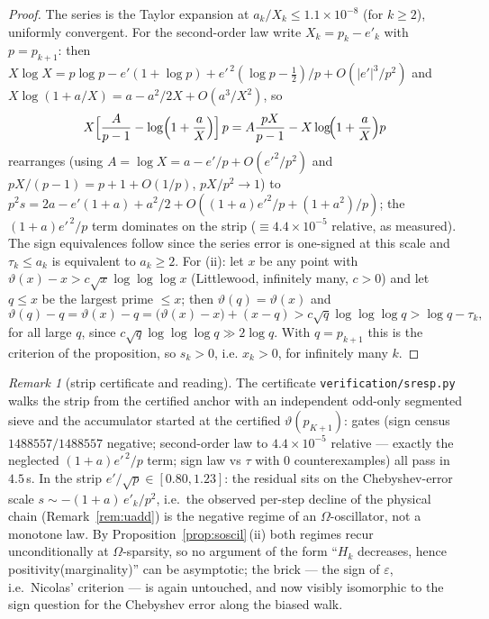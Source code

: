 \documentclass[11pt]{article}
\theoremstyle{remark}
\newtheorem{remark}[theorem]{Remark}
\newcommand{\eps}{\varepsilon}
\begin{document}
\begin{proof}
The series is the Taylor expansion at $a_k/X_k\le1.1\times10^{-8}$ (for
$k\ge2$), uniformly convergent. For the second-order law write
$X_k=p_k-e'_k$ with $p=p_{k+1}$: then
$X\log X=p\log p-e'(1+\log p)+e'^{\,2}(\log p-\tfrac12)/p+O(|e'|^3/p^2)$
and $X\log(1+a/X)=a-a^2/2X+O(a^3/X^2)$, so
\[
X\Bigl[\frac{A}{p-1}-\log\Bigl(1+\frac aX\Bigr)\Bigr]\,p
=A\frac{pX}{p-1}-X\log\!\Bigl(1+\frac aX\Bigr)p
\]
rearranges (using $A=\log X=a-e'/p+O(e'^2/p^2)$ and
$pX/(p-1)=p+1+O(1/p)$, $pX/p^2\to1$) to $p^2s=2a-e'(1+a)+a^2/2+O((1+a)e'^2/p+(1+a^2)/p)$;
the $(1+a)e'^{\,2}/p$ term dominates on the strip ($\equiv4.4\times10^{-5}$
relative, as measured). The sign equivalences follow since the series
error is one-signed at this scale and $\tau_k\le a_k$ is equivalent to
$a_k\ge2$. For (ii): let $x$ be any point with
$\vartheta(x)-x>c\sqrt x\log\log\log x$ (Littlewood, infinitely many,
$c>0$) and let $q\le x$ be the largest prime $\le x$; then
$\vartheta(q)=\vartheta(x)$ and
\[
\vartheta(q)-q=\vartheta(x)-q=\bigl(\vartheta(x)-x\bigr)+(x-q)
>c\sqrt q\log\log\log q>\log q-\tau_k ,
\]
for all large $q$, since $c\sqrt q\log\log\log q\gg2\log q$. With
$q=p_{k+1}$ this is the criterion of the proposition, so $s_k>0$, i.e.
$x_k>0$, for infinitely many $k$.
\end{proof}

\begin{remark}[strip certificate and reading]\label{rem:soscilnum}
The certificate \texttt{verification/sresp.py} walks the strip from the
certified anchor with an independent odd-only segmented sieve and the
accumulator started at the certified $\vartheta(p_{K+1})$: gates (sign
census $1488557/1488557$ negative; second-order law to $4.4\times10^{-5}$
relative --- exactly the neglected $(1+a)e'^{\,2}/p$ term; sign law vs
$\tau$ with $0$ counterexamples) all pass in $4.5$\,s. In the strip
$e'/\sqrt p\in[0.80,1.23]$: the residual sits on the
Chebyshev-error scale $s\sim-(1+a)\,e'_k/p^2$, i.e.\ the observed
per-step decline of the physical chain (Remark~\ref{rem:uadd}) is the
negative regime of an $\Omega$-oscillator, not a monotone law. By
Proposition~\ref{prop:soscil}\,(ii) both regimes recur unconditionally
at $\Omega$-sparsity, so no argument of the form ``$H_k$ decreases,
hence positivity(marginality)'' can be asymptotic; the brick --- the
sign of $\eps$, i.e.\ Nicolas' criterion --- is again untouched, and
now visibly isomorphic to the sign question for the Chebyshev error
along the biased walk.
\end{remark}
\end{document}
